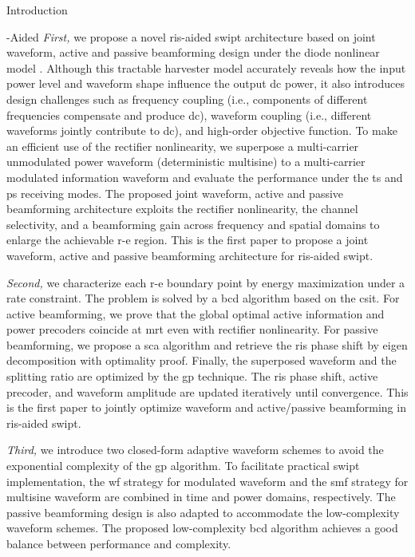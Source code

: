 \begin{section}{Introduction}
\begin{subsection}{-Aided }
		\emph{First,} we propose a novel \gls{ris}-aided \gls{swipt} architecture based on joint waveform, active and passive beamforming design under the diode nonlinear model \cite{Clerckx2016a}. Although this tractable harvester model accurately reveals how the input power level and waveform shape influence the output \gls{dc} power, it also introduces design challenges such as frequency coupling (i.e., components of different frequencies compensate and produce \gls{dc}), waveform coupling (i.e., different waveforms jointly contribute to \gls{dc}), and high-order objective function. To make an efficient use of the rectifier nonlinearity, we superpose a multi-carrier unmodulated power waveform (deterministic multisine) to a multi-carrier modulated information waveform and evaluate the performance under the \gls{ts} and \gls{ps} receiving modes. The proposed joint waveform, active and passive beamforming architecture exploits the rectifier nonlinearity, the channel selectivity, and a beamforming gain across frequency and spatial domains to enlarge the achievable \gls{r-e} region. This is the first paper to propose a joint waveform, active and passive beamforming architecture for \gls{ris}-aided \gls{swipt}.

		\emph{Second,} we characterize each \gls{r-e} boundary point by energy maximization under a rate constraint. The problem is solved by a \gls{bcd} algorithm based on the \gls{csit}. For active beamforming, we prove that the global optimal active information and power precoders coincide at \gls{mrt} even with rectifier nonlinearity. For passive beamforming, we propose a \gls{sca} algorithm and retrieve the \gls{ris} phase shift by eigen decomposition with optimality proof. Finally, the superposed waveform and the splitting ratio are optimized by the \gls{gp} technique. The \gls{ris} phase shift, active precoder, and waveform amplitude are updated iteratively until convergence. This is the first paper to jointly optimize waveform and active/passive beamforming in \gls{ris}-aided \gls{swipt}.

		\emph{Third,} we introduce two closed-form adaptive waveform schemes to avoid the exponential complexity of the \gls{gp} algorithm. To facilitate practical \gls{swipt} implementation, the \gls{wf} strategy for modulated waveform and the \gls{smf} strategy for multisine waveform are combined in time and power domains, respectively. The passive beamforming design is also adapted to accommodate the low-complexity waveform schemes. The proposed low-complexity \gls{bcd} algorithm achieves a good balance between performance and complexity.


\end{subsection}
\end{section}
